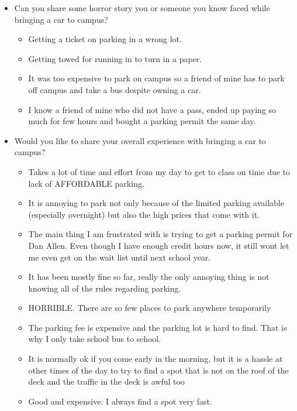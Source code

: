 \documentclass{acm_proc_article-sp}
\begin{document}
\begin{itemize}
    \item Can you share some horror story you or someone you know faced while bringing a car to campus?
    
    \begin{itemize}
        \item Getting a ticket on parking in a wrong lot.
        \item Getting towed for running in to turn in a paper.
        \item It was too expensive to park on campus so a friend of mine has to park off campus and take a bus despite owning a car.
        \item I know a friend of mine who did not have a pass, ended up paying so much for few hours and bought a parking permit the same day.
    \end{itemize}
    
    \item Would you like to share your overall experience with bringing a car to campus?
    
    \begin{itemize}
        \item Takes a lot of time and effort from my day to get to class on time due to lack of AFFORDABLE parking.
        \item It is annoying to park not only because of the limited parking available (especially overnight) but also the high prices that come with it.
        \item The main thing I am frustrated with is trying to get a parking permit for Dan Allen. Even though I have enough credit hours now, it still won\textsc{}t let me even get on the wait list until next school year.
        \item It has been mostly fine so far, really the only annoying thing is not knowing all of the rules regarding parking.
        \item HORRIBLE. There are so few places to park anywhere temporarily
        \item The parking fee is expensive and the parking lot is hard to find. That is why I only take school bus to school.
        \item It is normally ok if you come early in the morning, but it is a hassle at other times of the day to try to find a spot that is not on the roof of the deck and the traffic in the deck is awful too
        \item Good and expensive. I always find a spot very fast.
    \end{itemize}

\end{itemize}
\end{document}
